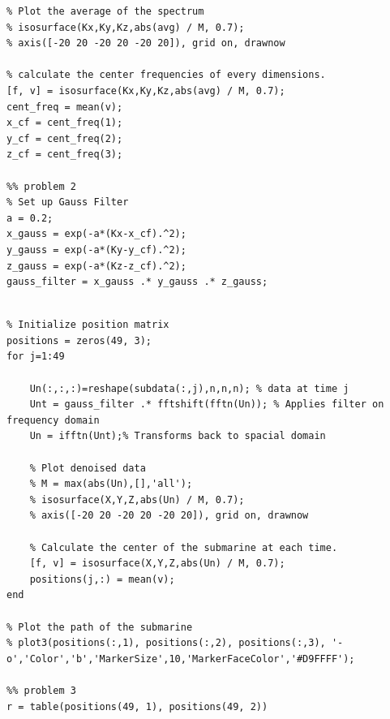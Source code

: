 \documentclass{article}
\begin{document}
\begin{appendices}
\begin{listing}[H]
\begin{verbatim}
% Plot the average of the spectrum
% isosurface(Kx,Ky,Kz,abs(avg) / M, 0.7);
% axis([-20 20 -20 20 -20 20]), grid on, drawnow

% calculate the center frequencies of every dimensions.
[f, v] = isosurface(Kx,Ky,Kz,abs(avg) / M, 0.7);
cent_freq = mean(v); 
x_cf = cent_freq(1);
y_cf = cent_freq(2);
z_cf = cent_freq(3);

%% problem 2
% Set up Gauss Filter 
a = 0.2;
x_gauss = exp(-a*(Kx-x_cf).^2); 
y_gauss = exp(-a*(Ky-y_cf).^2); 
z_gauss = exp(-a*(Kz-z_cf).^2); 
gauss_filter = x_gauss .* y_gauss .* z_gauss;


  \end{verbatim}
\end{listing}
\begin{listing}
  \begin{verbatim}
% Initialize position matrix
positions = zeros(49, 3);
for j=1:49

    Un(:,:,:)=reshape(subdata(:,j),n,n,n); % data at time j
    Unt = gauss_filter .* fftshift(fftn(Un)); % Applies filter on frequency domain
    Un = ifftn(Unt);% Transforms back to spacial domain
    
    % Plot denoised data
    % M = max(abs(Un),[],'all');
    % isosurface(X,Y,Z,abs(Un) / M, 0.7);
    % axis([-20 20 -20 20 -20 20]), grid on, drawnow
    
    % Calculate the center of the submarine at each time.
    [f, v] = isosurface(X,Y,Z,abs(Un) / M, 0.7);
    positions(j,:) = mean(v);
end

% Plot the path of the submarine
% plot3(positions(:,1), positions(:,2), positions(:,3), '-o','Color','b','MarkerSize',10,'MarkerFaceColor','#D9FFFF');

%% problem 3
r = table(positions(49, 1), positions(49, 2))
  \end{verbatim}
\end{listing}

\end{appendices}
\end{document}
